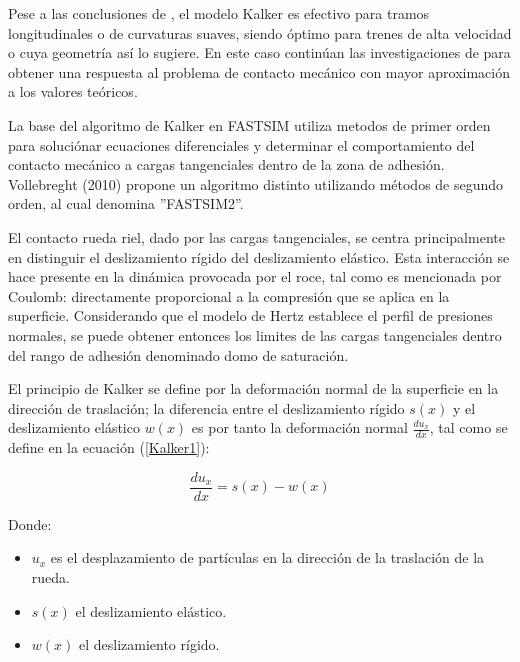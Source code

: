 \documentclass[main]{subfiles}
\begin{document}
	Pese a las conclusiones de \citet{springerlink:10.1007/s11044-007-9094-y}, el modelo Kalker es efectivo para tramos longitudinales o de curvaturas suaves, siendo óptimo para trenes de alta velocidad o cuya geometría así lo sugiere. En este caso \citet{2011CompM..47..105V} continúan las investigaciones de \citet{Kalker1971VSD} para obtener una respuesta al problema de contacto mecánico con mayor aproximación a los valores teóricos.

	La base del algoritmo de Kalker en FASTSIM utiliza metodos de primer orden para soluciónar ecuaciones diferenciales y determinar el comportamiento del contacto mecánico a cargas tangenciales dentro de la zona de adhesión. Vollebreght (2010) propone un algoritmo distinto utilizando métodos de segundo orden, al cual denomina ''FASTSIM2''.

	El contacto rueda riel, dado por las cargas tangenciales, se centra principalmente en distinguir el deslizamiento rígido del deslizamiento elástico. Esta interacción se hace presente en la dinámica provocada por el roce, tal como es mencionada por Coulomb: directamente proporcional a la compresión que se aplica en la superficie. Considerando que el modelo de Hertz establece el perfil de presiones normales, se puede obtener entonces los limites de las cargas tangenciales dentro del rango de adhesión denominado domo de saturación.
  
El principio de Kalker se define por la deformación normal de la superficie en la dirección de traslación; la diferencia entre el deslizamiento rígido $s(x)$ y el deslizamiento elástico $w(x)$ es por tanto la deformación normal $\frac{du_x}{dx}$, tal como se define en la ecuación (\ref{Kalker1}):

\begin{equation}
\label{Kalker1}
\frac{du_x}{dx}=s(x)-w(x)
\end{equation}

\par \hspace{1cm}
\begin{minipage}{10cm}
\begin{spacing}{0.5}
Donde:
\begin{itemize}
\item $u_x$ es el desplazamiento de partículas en la dirección de la traslación de la rueda.
\item $s(x)$ el deslizamiento elástico.
\item $w(x)$ el deslizamiento rígido.
\end{itemize}
\end{spacing}
\end{minipage}
\end{document}
